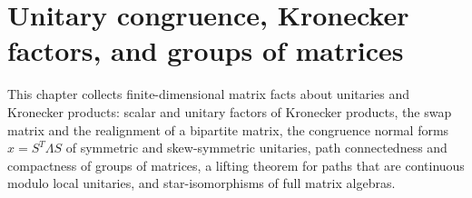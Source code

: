 \chapter{Unitary congruence, Kronecker factors, and groups of matrices}
\label{ch:matrixgroups}

This chapter collects finite-dimensional matrix facts about unitaries and
Kronecker products: scalar and unitary factors of Kronecker products, the swap
matrix and the realignment of a bipartite matrix, the congruence normal forms
$x=S^T\Lambda S$ of symmetric and skew-symmetric unitaries, path connectedness
and compactness of groups of matrices, a lifting theorem for paths that are
continuous modulo local unitaries, and star-isomorphisms of full matrix
algebras.





